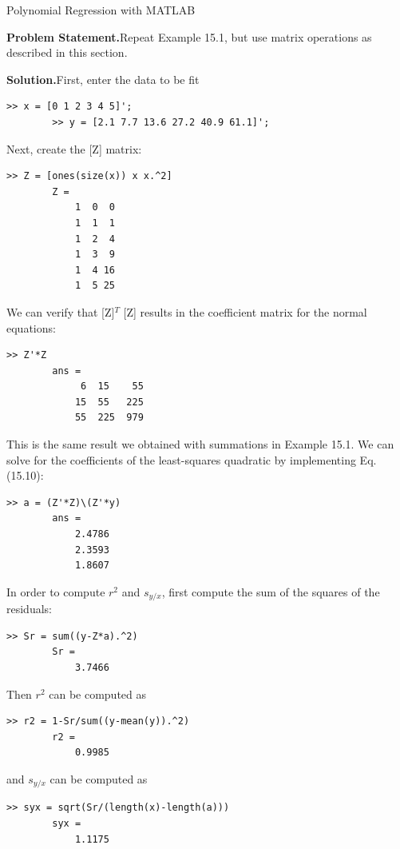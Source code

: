 \documentclass[../main.tex]{subfiles}
\begin{document}
\begin{example} Polynomial Regression with MATLAB

    \textbf{Problem Statement.}\quad Repeat Example 15.1, but use matrix operations as described in this
	section.

	\noindent\textbf{Solution.}\quad First, enter the data to be fit

	\begin{lstlisting}[numbers=none]
		>> x = [0 1 2 3 4 5]';
		>> y = [2.1 7.7 13.6 27.2 40.9 61.1]';
	\end{lstlisting}

	\noindent Next, create the [Z] matrix:

	\begin{lstlisting}[numbers=none]
		>> Z = [ones(size(x)) x x.^2]
		Z = 
			1  0  0 
			1  1  1 
			1  2  4 
			1  3  9 
			1  4 16 
			1  5 25
	\end{lstlisting}

	\noindent We can verify that [Z]$^T$ [Z] results in the coefficient matrix for the normal equations:

	\begin{lstlisting}[numbers=none]
		>> Z'*Z
		ans = 
			 6  15    55 
			15  55   225 
			55  225  979
	\end{lstlisting}

	\noindent This is the same result we obtained with summations in Example 15.1. We can solve for the	coefficients of the least-squares quadratic by implementing Eq. (15.10):

	\begin{lstlisting}[numbers=none]
		>> a = (Z'*Z)\(Z'*y)
		ans =
			2.4786
			2.3593
			1.8607
	\end{lstlisting}

	\noindent In order to compute $r^2$ and $s_{y/x}$, first compute the sum of the squares of the residuals:

	\begin{lstlisting}[numbers=none]
		>> Sr = sum((y-Z*a).^2)
		Sr =
			3.7466
	\end{lstlisting}

	\noindent Then $r^2$ can be computed as

	\begin{lstlisting}[numbers=none]
		>> r2 = 1-Sr/sum((y-mean(y)).^2)
		r2 =
			0.9985
	\end{lstlisting}

	\noindent and $s_{y/x}$ can be computed as

	\begin{lstlisting}[numbers=none]
		>> syx = sqrt(Sr/(length(x)-length(a)))
		syx =
			1.1175
	\end{lstlisting}
\end{example}
\end{document}
